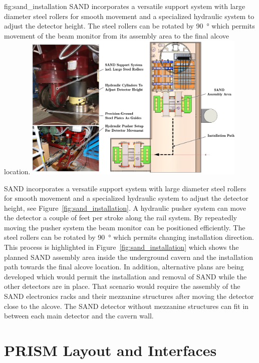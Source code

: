\begin{dunefigure}{fig:sand_installation}
{SAND incorporates a versatile support system with large diameter steel rollers for smooth movement and a specialized hydraulic system to adjust the detector height. The steel rollers can be rotated by \SI{90}{\degree} which permits movement of the beam monitor from its assembly area to the final alcove location.}
\includegraphics[width=0.8\textwidth]{graphics/i-and-i/sand_installation}
\end{dunefigure}

SAND incorporates a versatile support system with large diameter steel rollers for smooth movement and a specialized hydraulic system to adjust the detector height, see Figure~\ref{fig:sand_installation}. A hydraulic pusher system can move the detector a couple of feet per stroke along the rail system. By repeatedly moving the pusher system the beam monitor can be positioned efficiently. The steel rollers can be rotated by \SI{90}{\degree} which permits changing installation direction. This process is highlighted in Figure~\ref{fig:sand_installation} which shows the planned SAND assembly area inside the underground cavern and the installation path towards the final alcove location. In addition, alternative plans are being developed which would permit the installation and removal of SAND while the other detectors are in place. That scenario would require the assembly of the SAND electronics racks and their mezzanine structures after moving the detector close to the alcove. The SAND detector without mezzanine structures can fit in between each main detector and the cavern wall.

\section{PRISM Layout and Interfaces}
\label{sec:int-inst-prism-layout}

